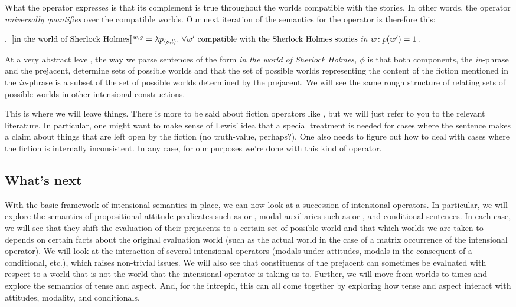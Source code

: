 What the operator  expresses is that
its complement is true throughout the worlds compatible with the stories. In
other words, the operator \emph{universally quantifies} over the compatible
worlds. Our next iteration of the semantics for the operator is therefore this:

\ex. $\llbracket \mbox{in the world of Sherlock Holmes} \rrbracket^{w,g} =\\
\lambda p_{\langle s,t \rangle}.\ \forall w' \mbox{ compatible with the Sherlock Holmes stories \emph{in} } w\!:\\
p(w') = 1$.

At a very abstract level, the way we parse sentences of the form \emph{in the
  world of Sherlock Holmes, $\phi$} is that both components, the
\emph{in}-phrase and the prejacent, determine sets of possible worlds and that
the set of possible worlds representing the content of the fiction mentioned in
the \emph{in}-phrase is a subset of the set of possible worlds determined by the
prejacent. We will see the same rough structure of relating sets of possible
worlds in other intensional constructions.

This is where we will leave things. There is more to be said about fiction
operators like , but we will just
refer to you to the relevant literature. In particular, one might want to make
sense of Lewis' idea that a special treatment is needed for cases where the
sentence makes a claim about things that are left open by the fiction (no
truth-value, perhaps?). One also needs to figure out how to deal with cases
where the fiction is internally inconsistent. In any case, for our purposes
we're done with this kind of operator.

\subsection{What's next}
\label{sec:next}

With the basic framework of intensional semantics in place, we can now look at a
succession of intensional operators. In particular, we will explore the
semantics of propositional attitude predicates such as  or
, modal auxiliaries such as  or
, and conditional sentences. In each case, we will see that
they shift the evaluation of their prejacents to a certain set of possible world
and that which worlds we are taken to depends on certain facts about the
original evaluation world (such as the actual world in the case of a matrix
occurrence of the intensional operator). We will look at the interaction of
several intensional operators (modals under attitudes, modals in the consequent
of a conditional, etc.), which raises non-trivial issues. We will also see that
constituents of the prejacent can sometimes be evaluated with respect to a world
that is not the world that the intensional operator is taking us to. Further, we
will move from worlds to times and explore the semantics of tense and aspect.
And, for the intrepid, this can all come together by exploring how tense and
aspect interact with attitudes, modality, and conditionals.

